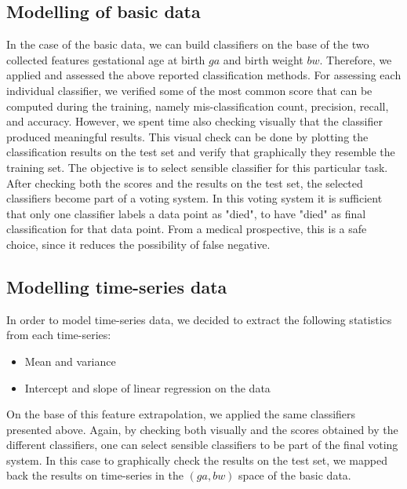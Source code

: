 \documentclass[a4paper,11pt]{article}
\begin{document}

\subsection{Modelling of basic data}
In the case of the basic data, we can build classifiers on the base of the two collected features gestational age at birth $ga$ and birth weight $bw$. Therefore, we applied and assessed the above reported classification methods. For assessing each individual classifier, we verified some of the most common score that can be computed during the training, namely mis-classification count, precision, recall, and accuracy. However, we spent time also checking visually that the classifier produced meaningful results. This visual check can be done by plotting the classification results on the test set and verify that graphically they resemble the training set. The objective is to select sensible classifier for this particular task. After checking both the scores and the results on the test set, the selected classifiers become part of a voting system. In this voting system it is sufficient that only one classifier labels a data point as "died", to have "died" as final classification for that data point. From a medical prospective, this is a safe choice, since it reduces the possibility of false negative.

\subsection{Modelling time-series data}
In order to model time-series data, we decided to extract the following statistics from each time-series:
\begin{itemize}
    \item Mean and variance
    \item Intercept and slope of linear regression on the data
\end{itemize}

On the base of this feature extrapolation, we applied the same classifiers presented above. Again, by checking both visually and the scores obtained by the different classifiers, one can select sensible classifiers to be part of the final voting system. In this case to graphically check the results on the test set, we mapped back the results on time-series in the $(ga, bw)$ space of the basic data.
\end{document}
